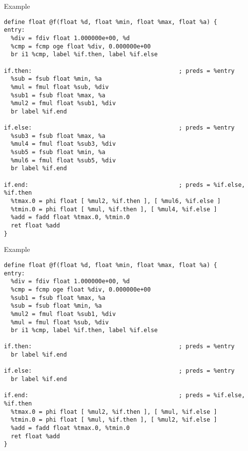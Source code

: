 \documentclass{beamer}
\begin{document}
\begin{frame}[fragile]{Example}
\begin{adjustbox}{width=\textwidth,height=\someheight,keepaspectratio}
\begin{lstlisting}
define float @f(float %d, float %min, float %max, float %a) {
entry:
  %div = fdiv float 1.000000e+00, %d
  %cmp = fcmp oge float %div, 0.000000e+00
  br i1 %cmp, label %if.then, label %if.else

if.then:                                          ; preds = %entry
  %sub = fsub float %min, %a
  %mul = fmul float %sub, %div
  %sub1 = fsub float %max, %a
  %mul2 = fmul float %sub1, %div
  br label %if.end

if.else:                                          ; preds = %entry
  %sub3 = fsub float %max, %a
  %mul4 = fmul float %sub3, %div
  %sub5 = fsub float %min, %a
  %mul6 = fmul float %sub5, %div
  br label %if.end

if.end:                                           ; preds = %if.else, %if.then
  %tmax.0 = phi float [ %mul2, %if.then ], [ %mul6, %if.else ]
  %tmin.0 = phi float [ %mul, %if.then ], [ %mul4, %if.else ]
  %add = fadd float %tmax.0, %tmin.0
  ret float %add
}
\end{lstlisting}
\end{adjustbox}
\end{frame}

\begin{frame}[fragile]{Example}
\begin{adjustbox}{width=\textwidth,height=\someheight,keepaspectratio}
\begin{lstlisting}
define float @f(float %d, float %min, float %max, float %a) {
entry:
  %div = fdiv float 1.000000e+00, %d
  %cmp = fcmp oge float %div, 0.000000e+00
  %sub1 = fsub float %max, %a
  %sub = fsub float %min, %a
  %mul2 = fmul float %sub1, %div
  %mul = fmul float %sub, %div
  br i1 %cmp, label %if.then, label %if.else

if.then:                                          ; preds = %entry
  br label %if.end

if.else:                                          ; preds = %entry
  br label %if.end

if.end:                                           ; preds = %if.else, %if.then
  %tmax.0 = phi float [ %mul2, %if.then ], [ %mul, %if.else ]
  %tmin.0 = phi float [ %mul, %if.then ], [ %mul2, %if.else ]
  %add = fadd float %tmax.0, %tmin.0
  ret float %add
}
\end{lstlisting}
\end{adjustbox}
\end{frame}
\end{document}
